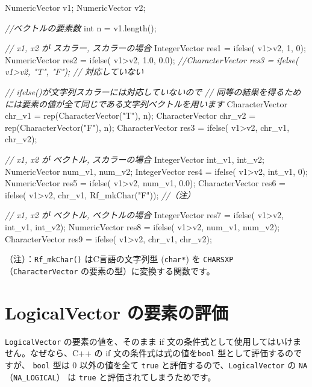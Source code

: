 \documentclass[]{book}
\newenvironment{Shaded}{\begin{snugshade}}{\end{snugshade}}
\newcommand{\CommentTok}[1]{\textcolor[rgb]{0.56,0.35,0.01}{\textit{#1}}}
\newcommand{\DataTypeTok}[1]{\textcolor[rgb]{0.13,0.29,0.53}{#1}}
\newcommand{\DecValTok}[1]{\textcolor[rgb]{0.00,0.00,0.81}{#1}}
\newcommand{\FloatTok}[1]{\textcolor[rgb]{0.00,0.00,0.81}{#1}}
\newcommand{\NormalTok}[1]{#1}
\newcommand{\StringTok}[1]{\textcolor[rgb]{0.31,0.60,0.02}{#1}}
\begin{document}
\begin{Shaded}
\begin{Highlighting}[]
\NormalTok{NumericVector v1;}
\NormalTok{NumericVector v2;}

\CommentTok{//ベクトルの要素数}
\DataTypeTok{int}\NormalTok{ n = v1.length();}

\CommentTok{// x1, x2 が スカラー, スカラーの場合}
\NormalTok{IntegerVector res1     = ifelse( v1>v2, }\DecValTok{1}\NormalTok{, }\DecValTok{0}\NormalTok{);}
\NormalTok{NumericVector res2     = ifelse( v1>v2, }\FloatTok{1.0}\NormalTok{, }\FloatTok{0.0}\NormalTok{);}
\CommentTok{//CharacterVector res3 = ifelse( v1>v2, "T", "F"); // 対応していない}

\CommentTok{// ifelse()が文字列スカラーには対応していないので}
\CommentTok{// 同等の結果を得るためには要素の値が全て同じである文字列ベクトルを用います}
\NormalTok{CharacterVector chr_v1 = rep(CharacterVector(}\StringTok{"T"}\NormalTok{), n);}
\NormalTok{CharacterVector chr_v2 = rep(CharacterVector(}\StringTok{"F"}\NormalTok{), n);}
\NormalTok{CharacterVector res3   = ifelse( v1>v2, chr_v1, chr_v2);}

\CommentTok{// x1, x2 が ベクトル, スカラーの場合}
\NormalTok{IntegerVector int_v1, int_v2;}
\NormalTok{NumericVector num_v1, num_v2;}
\NormalTok{IntegerVector   res4 = ifelse( v1>v2, int_v1, }\DecValTok{0}\NormalTok{);}
\NormalTok{NumericVector   res5 = ifelse( v1>v2, num_v1, }\FloatTok{0.0}\NormalTok{);}
\NormalTok{CharacterVector res6 = ifelse( v1>v2, chr_v1, Rf_mkChar(}\StringTok{"F"}\NormalTok{)); }\CommentTok{//（注）}

\CommentTok{// x1, x2 が ベクトル, ベクトルの場合}
\NormalTok{IntegerVector   res7 = ifelse( v1>v2, int_v1, int_v2);}
\NormalTok{NumericVector   res8 = ifelse( v1>v2, num_v1, num_v2);}
\NormalTok{CharacterVector res9 = ifelse( v1>v2, chr_v1, chr_v2);}
\end{Highlighting}
\end{Shaded}

（注）：\texttt{Rf\_mkChar()} はC言語の文字列型 (\texttt{char*}) を \texttt{CHARSXP} （\texttt{CharacterVector} の要素の型）に変換する関数です。

\hypertarget{logicalvector-}{%
\section{LogicalVector の要素の評価}\label{logicalvector-}}

\texttt{LogicalVector} の要素の値を、そのまま if 文の条件式として使用してはいけません。なぜなら、C++ の if 文の条件式は式の値を\texttt{bool} 型として評価するのですが、 \texttt{bool} 型は 0 以外の値を全て \texttt{true} と評価するので、\texttt{LogicalVector} の \texttt{NA}（\texttt{NA\_LOGICAL}） は \texttt{true} と評価されてしまうためです。
\end{document}
